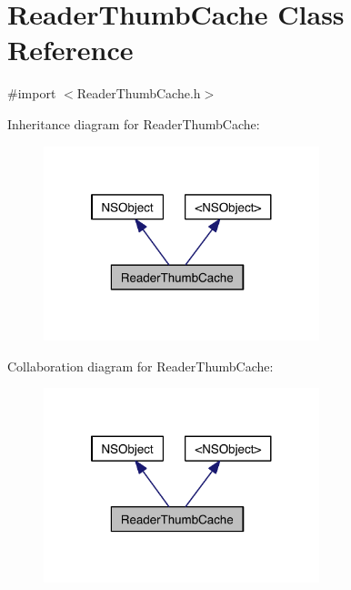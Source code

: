 \hypertarget{interface_reader_thumb_cache}{\section{Reader\-Thumb\-Cache Class Reference}
\label{da/d97/interface_reader_thumb_cache}
}


{\ttfamily \#import $<$Reader\-Thumb\-Cache.\-h$>$}



Inheritance diagram for Reader\-Thumb\-Cache\-:
\nopagebreak
\begin{figure}[H]
\begin{center}
\leavevmode
\includegraphics[width=227pt]{d1/d7c/interface_reader_thumb_cache__inherit__graph}
\end{center}
\end{figure}


Collaboration diagram for Reader\-Thumb\-Cache\-:
\nopagebreak
\begin{figure}[H]
\begin{center}
\leavevmode
\includegraphics[width=227pt]{dd/d95/interface_reader_thumb_cache__coll__graph}
\end{center}
\end{figure}
